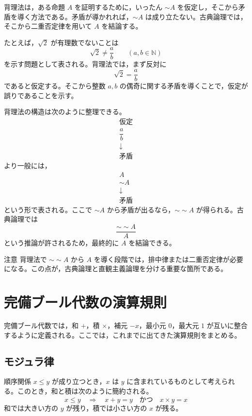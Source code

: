 \documentclass[../main.tex]{subfiles}
\begin{document}
背理法は，ある命題 \(A\) を証明するために，いったん \(\sim A\) を仮定し，そこから矛盾を導く方法である。矛盾が導かれれば，\(\sim A\) は成り立たない。古典論理では，そこから二重否定律を用いて \(A\) を結論する。

たとえば，\(\sqrt{2}\) が有理数でないことは
\[
  \sqrt{2} \neq \frac{a}{b}
  \qquad
  (a,b \in \mathbb{N})
\]
を示す問題として表される。背理法では，まず反対に
\[
  \sqrt{2} = \frac{a}{b}
\]
であると仮定する。そこから整数 \(a,b\) の偶奇に関する矛盾を導くことで，仮定が誤りであることを示す。

背理法の構造は次のように整理できる。
\[
  \begin{array}{c}
    \text{仮定} \\
    \dfrac{a}{b} \\
    \downarrow \\
    \text{矛盾}
  \end{array}
\]
より一般には，
\[
  \begin{array}{c}
    A \\
    \sim A \\
    \downarrow \\
    \text{矛盾}
  \end{array}
\]
という形で表される。ここで \(\sim A\) から矛盾が出るなら，\(\sim\sim A\) が得られる。古典論理では
\[
  \frac{\sim\sim A}{A}
\]
という推論が許されるため，最終的に \(A\) を結論できる。

\begin{sidebox}[TBred]{注意}
  背理法で \(\sim\sim A\) から \(A\) を導く段階では，排中律または二重否定律が必要になる。この点が，古典論理と直観主義論理を分ける重要な箇所である。
\end{sidebox}

\section{完備ブール代数の演算規則}

完備ブール代数では，和 \(+\)，積 \(\times\)，補元 \(-x\)，最小元 \(0\)，最大元 \(1\) が互いに整合するように定義される。ここでは，これまでに出てきた演算規則をまとめる。

\subsection{モジュラ律}

順序関係 \(x \leq y\) が成り立つとき，\(x\) は \(y\) に含まれているものとして考えられる。このとき，和と積は次のように簡約される。
\[
  x \leq y
  \quad \Rightarrow \quad
  x + y = y
  \quad \text{かつ} \quad
  x \times y = x
\]
和では大きい方の \(y\) が残り，積では小さい方の \(x\) が残る。
\end{document}
